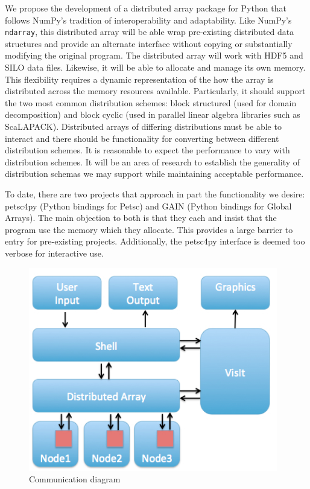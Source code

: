 \documentclass[letterpaper,11pt]{article}
\begin{document}
We propose the development of a distributed array package for Python that follows NumPy's 
tradition of interoperability and adaptability.  Like NumPy's \texttt{ndarray}, this 
distributed array will be able wrap pre-existing distributed data structures and provide 
an alternate interface without copying or substantially modifying the original program.  
The distributed array will work with HDF5\cite{HDF5} and SILO data files.  Likewise, it 
will be able to allocate and manage its own memory.  This flexibility requires a dynamic 
representation of the how the array is distributed across the memory resources available.  
Particularly, it should support the two most common distribution schemes: block structured 
(used for domain decomposition) and block cyclic (used in parallel linear algebra libraries 
such as ScaLAPACK\cite{scalapack}).  Distributed arrays of differing distributions must be 
able to interact and there should be functionality for converting between different 
distribution schemes.  It is reasonable to expect the performance to vary with distribution 
schemes.  It will be an area of research to establish the generality of distribution 
schemas we may support while maintaining acceptable performance.

To date, there are two projects that approach in part the functionality we desire: 
petsc4py\cite{petsc4py-web-page} (Python bindings for Petsc\cite{petsc-user-ref}) 
and GAIN\cite{global-arrays-python} (Python bindings for Global Arrays\cite{global-arrays}).  
The main objection to both is that they each and insist that the program use the 
memory which they allocate.  This provides a large barrier to entry for pre-existing 
projects.  Additionally, the petsc4py interface is deemed too verbose for interactive use.

\begin{figure}[<+htpb+>]
	\begin{center}
		\includegraphics[height=3.5in]{communication.jpg}
	\end{center}
	\caption{Communication diagram}
	\label{fig:communication}
\end{figure}
\end{document}
